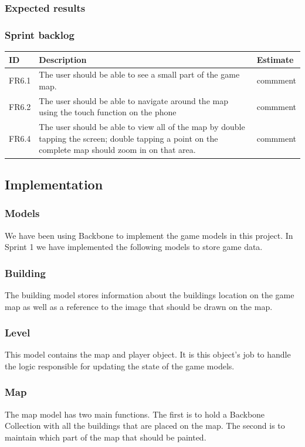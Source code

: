 \subsubsection{Expected results}


\subsubsection{Sprint backlog}
\begin{tabular}{| p{1cm} | p{8cm} | p{3cm} |}
	\hline
	ID & Description & Estimate \\ \hline
	FR6.1 & The user should be able to see a small part of the game map. & commment \\ \hline
	FR6.2 & The user should be able to navigate around the map using the touch function on the phone & commment \\ \hline
	FR6.4 & The user should be able to view all of the map by double tapping the screen; double tapping a point on the complete map should zoom in on that area. & commment \\
	\hline
\end{tabular}

\subsection{Implementation}

\subsubsection{Models}
We have been using Backbone to implement the game models in this project. In Sprint 1 we have implemented 
the following models to store game data.
\subsubsection*{Building}
The building model stores information about the buildings location on the game map as well as a reference 
to the image that should be drawn on the map.
\subsubsection*{Level}
This model contains the map and player object. It is this object's job to handle the logic responsible for 
updating the state of the game models.
\subsubsection*{Map}
The map model has two main functions. The first is to hold a Backbone Collection with all the buildings 
that are placed on the map. The second is to maintain which part of the map that should be painted.
